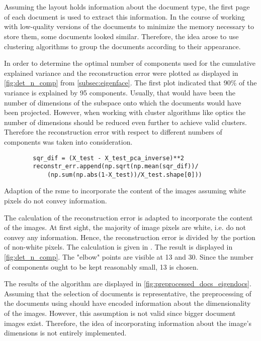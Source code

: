 \section{\eigendocs{}}\label{sec:evaluation-eigendocs}
Assuming the layout holds information about the document type, the first page of each document is used to extract this information.
In the course of working with low-quality versions of the documents to minimize the memory necessary to store them, some documents looked similar.
Therefore, the idea arose to use clustering algorithms to group the documents according to their appearance.

In order to determine the optimal number of components used for \eigendocs{} the cumulative explained variance and the reconstruction error were plotted 
as displayed in \autoref{fig:det_n_comp} from \autoref{subsec:eigenface}.
The first plot indicated that 90\% of the variance is explained by 95 components.
Usually, that would have been the number of dimensions of the subspace onto which the documents would have been projected.
However, when working with cluster algorithms like \ac{optics} the number of dimensions should be reduced even further to achieve valid clusters.
Therefore the reconstruction error with respect to different numbers of components was taken into consideration.

\begin{listing}[htp]
    \begin{verbatim}
        sqr_dif = (X_test - X_test_pca_inverse)**2
        reconstr_err.append(np.sqrt(np.mean(sqr_dif))/
            (np.sum(np.abs(1-X_test))/X_test.shape[0])) 
    \end{verbatim}
    \caption[Adaption of the \ac{rsme}]{
        Adaption of the \ac{rsme} to incorporate the content of the images assuming white pixels do not convey information.
    }
    \label{lst:impl-weighted-rsme}
\end{listing}

The calculation of the reconstruction error is adapted to incorporate the content of the images.
At first sight, the majority of image pixels are white, i.e. do not convey any information.
Hence, the reconstruction error is divided by the portion of non-white pixels. 
The calculation is given in .
The result is displayed in \autoref{fig:det_n_comp}.
The "elbow" points are visible at 13 and 30.
Since the number of components ought to be kept reasonably small, 13 is chosen.


The results of the \eigendocs{} algorithm are displayed in \autoref{fig:preprocessed_docs_eigendocs}.
Assuming that the selection of documents is representative, 
the preprocessing of the documents using \eigendocs{} should have encoded information about the dimensionality of the images.
However, this assumption is not valid since bigger document images exist.
Therefore, the idea of incorporating information about the image's dimensions is not entirely implemented.